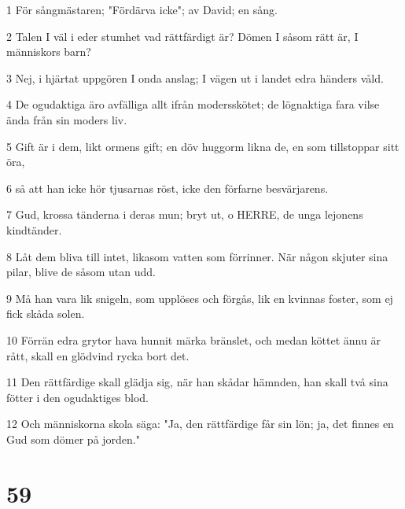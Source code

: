 \par 1 För sångmästaren; "Fördärva icke"; av David; en sång.
\par 2 Talen I väl i eder stumhet vad rättfärdigt är? Dömen I såsom rätt är, I människors barn?
\par 3 Nej, i hjärtat uppgören I onda anslag; I vägen ut i landet edra händers våld.
\par 4 De ogudaktiga äro avfälliga allt ifrån modersskötet; de lögnaktiga fara vilse ända från sin moders liv.
\par 5 Gift är i dem, likt ormens gift; en döv huggorm likna de, en som tillstoppar sitt öra,
\par 6 så att han icke hör tjusarnas röst, icke den förfarne besvärjarens.
\par 7 Gud, krossa tänderna i deras mun; bryt ut, o HERRE, de unga lejonens kindtänder.
\par 8 Låt dem bliva till intet, likasom vatten som förrinner. När någon skjuter sina pilar, blive de såsom utan udd.
\par 9 Må han vara lik snigeln, som upplöses och förgås, lik en kvinnas foster, som ej fick skåda solen.
\par 10 Förrän edra grytor hava hunnit märka bränslet, och medan köttet ännu är rått, skall en glödvind rycka bort det.
\par 11 Den rättfärdige skall glädja sig, när han skådar hämnden, han skall två sina fötter i den ogudaktiges blod.
\par 12 Och människorna skola säga: "Ja, den rättfärdige får sin lön; ja, det finnes en Gud som dömer på jorden."

\chapter{59}

